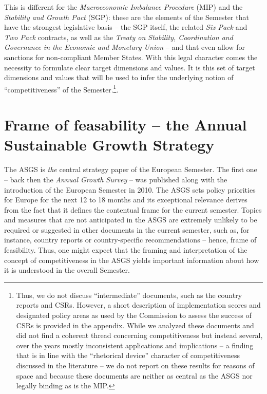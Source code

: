 \documentclass[
]{article}
\begin{document}
This is different for the \emph{Macroeconomic Imbalance Procedure} (MIP) and
the \emph{Stability and Growth Pact} (SGP):
these are the elements of the Semester that have the strongest
legislative basis -- the SGP itself, the related \emph{Six Pack} and \emph{Two Pack}
contracts, as well as the
\emph{Treaty on Stability, Coordination and Governance in the Economic and Monetary Union} --
and that even allow for sanctions for non-compliant Member States.
With this legal character comes the necessity to formulate clear target
dimensions and values. It is this set of target dimensions and values that
will be used to infer the underlying notion of \enquote{competitiveness} of the
Semester.\footnote{Thus, we do not discuss \enquote{intermediate} documents, such as the country reports
  and CSRs. However, a short description of implementation scores and designated
  policy areas as used by the
  Commission to assess the success of CSRs is provided in the appendix.
  While we analyzed these documents and did not find a coherent thread concerning
  competitiveness but instead several, over the years mostly inconsistent
  applications and implications -- a finding that is in line
  with the \enquote{rhetorical device} character of competitiveness discussed in the
  literature \citep[e.g.][]{Linsi} -- we do not report on these results for
  reasons of space and because these documents are neither as central as the ASGS
  nor legally binding as is the MIP.}.

\hypertarget{sec:ASGS}{%
\section{Frame of feasability -- the Annual Sustainable Growth Strategy}\label{sec:ASGS}}

The ASGS is \emph{the} central strategy paper of the European Semester.
The first one -- back then the \emph{Annual Growth Survey}
-- was published along with the introduction of the European Semester in 2010.
The ASGS sets policy priorities for Europe for the next 12 to 18 months
and its exceptional relevance derives from the fact
that it defines the contentual frame for the current semester.
Topics and measures that are not anticipated in the ASGS are extremely unlikely to
be required or
suggested in other documents in the current semester, such as, for instance,
country reports or country-specific recommendations -- hence, frame of feasibility.
Thus, one might expect that the framing and interpretation of the concept of
competitiveness in the ASGS yields important information about how
it is understood in the overall Semester.
\end{document}

